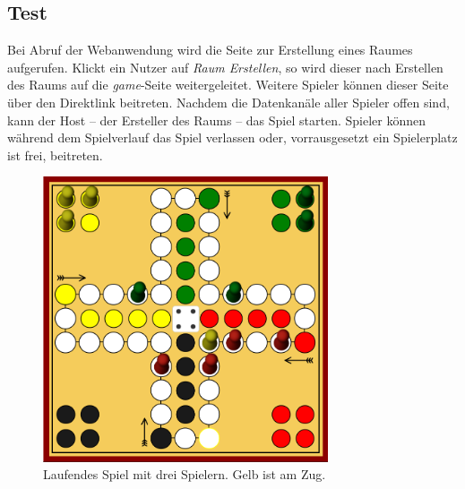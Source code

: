 

\subsection{Test}
Bei Abruf der Webanwendung wird die Seite zur Erstellung eines Raumes aufgerufen. Klickt ein Nutzer auf \textit{Raum Erstellen}, so wird dieser nach Erstellen des Raums auf die \textit{game}-Seite weitergeleitet. Weitere Spieler können dieser Seite über den Direktlink beitreten. Nachdem die Datenkanäle aller Spieler offen sind, kann der Host -- der Ersteller des Raums -- das Spiel starten. Spieler können während dem Spielverlauf das Spiel verlassen oder, vorrausgesetzt ein Spielerplatz ist frei, beitreten.\par

\vspace{6pt}
\begin{figure}[h]
\centering
\includegraphics[width=0.75\textwidth]{bilder/game-in-progress.png}
\caption{Laufendes Spiel mit drei Spielern. Gelb ist am Zug.}
\label{fig:maedngame}
\end{figure}
